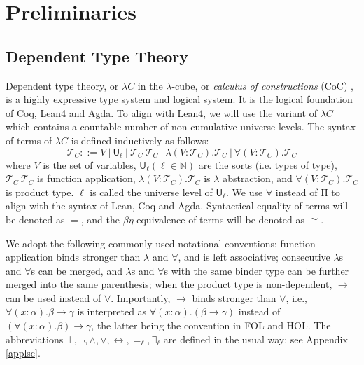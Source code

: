 \section{Preliminaries}

\subsection{Dependent Type Theory}\label{subdtt}

  Dependent type theory, or $\lambda C$ in the $\lambda$-cube,
  or \textit{calculus of constructions} (CoC) \cite{LambdaWithType},
  is a highly expressive type system and logical system. It is the logical
  foundation of Coq, Lean4 and Agda. To align with
  Lean4, we will use the variant of $\lambda C$ which contains a countable
  number of non-cumulative universe levels. The syntax of terms of $\lambda C$ is defined
  inductively as follows:
  $$\mathcal{T}_C ::= V \ | \ \mathsf{U}_\ell \ | \ \mathcal{T}_C \ \mathcal{T}_C \ |
    \ \lambda (V : \mathcal{T}_C). \mathcal{T}_C \ | \ \forall (V : \mathcal{T}_C). \mathcal{T}_C$$
  where $V$ is the set of variables, $\mathsf{U}_\ell (\ell \in \mathbb{N})$ are
  the sorts (i.e. types of type), $\mathcal{T}_C \ \mathcal{T}_C$ is function application,
  $\lambda (V : \mathcal{T}_C). \mathcal{T}_C$ is $\lambda$ abstraction, and
  $\forall (V : \mathcal{T}_C). \mathcal{T}_C$ is product type.
  $\ell$ is called the universe level of $\mathsf{U}_\ell$.
  We use $\forall$ instead of $\mathrm{\Pi}$ to align with the syntax of Lean, Coq and Agda.
  Syntactical equality of terms will be denoted as $=$, and the $\beta\eta$-equivalence of terms will be
  denoted as $\cong$.
  
  We adopt the following commonly used notational conventions:
  function application binds stronger than $\lambda$ and $\forall$, and is left associative;
  consecutive $\lambda$s and $\forall$s can be merged, and $\lambda$s and $\forall$s with the same
  binder type can be further merged into the same parenthesis; when the product type is non-dependent,
  $\to$ can be used instead of $\forall$. Importantly, $\to$ binds stronger than $\forall$, i.e.,
  $\forall (x : \alpha). \beta \to \gamma$ is interpreted as $\forall (x : \alpha). (\beta \to \gamma)$
  instead of $(\forall (x : \alpha). \beta) \to \gamma$, the latter being the convention in
  FOL and HOL. The abbreviations $\bot, \neg, \land, \lor, \leftrightarrow, =_\ell, \exists_\ell$
  are defined in the usual way; see Appendix \ref{applsc}.

